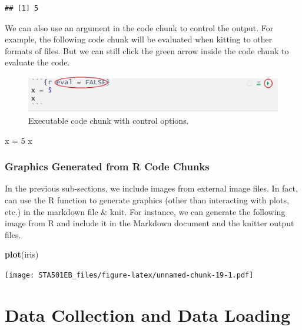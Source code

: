 \documentclass[
]{book}
\newenvironment{Shaded}{\begin{snugshade}}{\end{snugshade}}
\newcommand{\DecValTok}[1]{\textcolor[rgb]{0.00,0.00,0.81}{#1}}
\newcommand{\FunctionTok}[1]{\textcolor[rgb]{0.13,0.29,0.53}{\textbf{#1}}}
\newcommand{\NormalTok}[1]{#1}
\newcommand{\OtherTok}[1]{\textcolor[rgb]{0.56,0.35,0.01}{#1}}
\begin{document}
\begin{verbatim}
## [1] 5
\end{verbatim}

We can also use an argument in the code chunk to control the output. For example, the following code chunk will be evaluated when kitting to other formats of files. But we can still click the green arrow inside the code chunk to evaluate the code.

\begin{figure}

{\centering \includegraphics[width=0.8\linewidth]{img01/Executable-code-chunk-argument} 

}

\caption{Executable code chunk with control options.}\label{fig:unnamed-chunk-17}
\end{figure}

\begin{Shaded}
\begin{Highlighting}[]
\NormalTok{x }\OtherTok{=} \DecValTok{5}
\NormalTok{x}
\end{Highlighting}
\end{Shaded}

\hypertarget{graphics-generated-from-r-code-chunks}{%
\subsection{Graphics Generated from R Code Chunks}\label{graphics-generated-from-r-code-chunks}}

In the previous sub-sections, we include images from external image files. In fact, can use the R function to generate graphics (other than interacting with plots, etc.) in the markdown file \& knit. For instance, we can generate the following image from R and include it in the Markdown document and the knitter output files.

\begin{Shaded}
\begin{Highlighting}[]
\FunctionTok{plot}\NormalTok{(iris)}
\end{Highlighting}
\end{Shaded}

\texttt{[image: STA501EB\_files/figure-latex/unnamed-chunk-19-1.pdf]}

\hypertarget{data-collection-and-data-loading}{%
\chapter{Data Collection and Data Loading}\label{data-collection-and-data-loading}}
\end{document}
